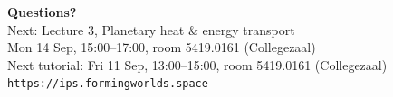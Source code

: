 \documentclass[aspectratio=169, 11pt]{beamer}
\begin{document}
\begin{frame}
  \vfill
  \begin{center}
    {\color{white}\LARGE\bfseries Questions?}\\[14pt]
    {\color{white!85}\large Next: Lecture 3, Planetary heat \& energy transport}\\[4pt]
    {\color{white!85}\small Mon 14 Sep, 15:00--17:00, room 5419.0161 (Collegezaal)}\\[12pt]
    {\color{white!85}\small Next tutorial: Fri 11 Sep, 13:00--15:00, room 5419.0161 (Collegezaal)}\\[20pt]
    {\color{white!70}\small \texttt{https://ips.formingworlds.space}}
  \end{center}
  \vfill
\end{frame}
\end{document}
